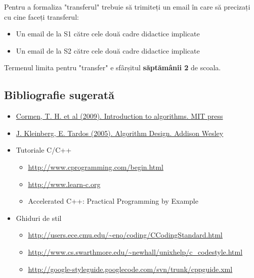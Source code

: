 \documentclass[../en-fa-lab.tex]{subfiles}
\begin{document}
Pentru a formaliza "transferul" trebuie să trimiteți un email în care să
precizați cu cine faceți transferul:

\begin{itemize}
\item
  Un email de la S1 către cele două cadre didactice implicate
\item
  Un email de la S2 către cele două cadre didactice implicate
\end{itemize}

Termenul limita pentru "transfer" e sfârșitul \textbf{săptămânii 2} de
scoala.

\subsection{Bibliografie sugerată}\label{bibliografie-sugeratux103}

\begin{itemize}
\item
    \href{https://drive.google.com/drive/folders/12NX3D8DLrPuU-9ffI9MjnoKUNjjftWRg?usp=sharing}{Cormen, T. H. et al (2009). Introduction to algorithms. MIT press}
  
\item
    \href{https://drive.google.com/drive/folders/12NX3D8DLrPuU-9ffI9MjnoKUNjjftWRg?usp=sharing}{J. Kleinberg, E. Tardos (2005). Algorithm Design. Addison Wesley}
\item
  Tutoriale C/C++

  \begin{itemize}
  \item
    \href{http://www.cprogramming.com/begin.html}{\ul{http://www.cprogramming.com/begin.html}}
  \item
    \href{http://www.learn-c.org}{\ul{http://www.learn-c.org}}
  \item
    Accelerated C++: Practical Programming by Example
  \end{itemize}
\item
  Ghiduri de stil

  \begin{itemize}
  \item
    \href{http://users.ece.cmu.edu/~eno/coding/CCodingStandard.html}{\ul{http://users.ece.cmu.edu/\textasciitilde eno/coding/CCodingStandard.html}}
  \item
    \href{http://www.cs.swarthmore.edu/~newhall/unixhelp/c_codestyle.html}{\ul{http://www.cs.swarthmore.edu/\textasciitilde newhall/unixhelp/c\_codestyle.html}}
  \item
    \href{http://google-styleguide.googlecode.com/svn/trunk/cppguide.xml}{\ul{http://google-styleguide.googlecode.com/svn/trunk/cppguide.xml}}
  \end{itemize}
\end{itemize}
\end{document}
